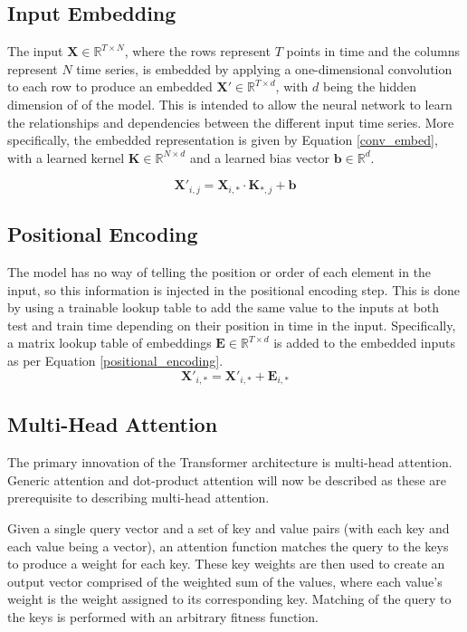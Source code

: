 \documentclass[conference]{IEEEtran}
\begin{document}
\subsection{Input Embedding}
The input $\boldsymbol{X} \in \mathbb{R}^{T \times N}$, where the rows represent $T$ points in time and the columns represent $N$ time series, is embedded by applying a one-dimensional convolution to each row to produce an embedded $\boldsymbol{X}' \in \mathbb{R}^{T \times d}$, with $d$ being the hidden dimension of of the model.
This is intended to allow the neural network to learn the relationships and dependencies between the different input time series.
More specifically, the embedded representation is given by Equation \ref{conv_embed}, with a learned kernel $\boldsymbol{K} \in \mathbb{R}^{N \times d}$ and a learned bias vector $\boldsymbol{b} \in \mathbb{R}^{d}$.

\begin{equation} \label{conv_embed}
\boldsymbol{X}'_{i, j} = \boldsymbol{X}_{i,*} \cdot \boldsymbol{K}_{*, j} + \boldsymbol{b}
\end{equation}

\subsection{Positional Encoding}
The model has no way of telling the position or order of each element in the input, so this information is injected in the positional encoding step.
This is done by using a trainable lookup table to add the same value to the inputs at both test and train time depending on their position in time in the input.
Specifically, a matrix lookup table of embeddings $\boldsymbol{E} \in \mathbb{R}^{T \times d}$ is added to the embedded inputs as per Equation \ref{positional_encoding}.
\begin{equation}\label{positional_encoding}
\boldsymbol{X}'_{i,*} = \boldsymbol{X}'_{i,*} + \boldsymbol{E}_{i,*}
\end{equation}

\subsection{Multi-Head Attention} \label{multihead_attention}
The primary innovation of the Transformer architecture is multi-head attention.
Generic attention and dot-product attention will now be described as these are prerequisite to describing multi-head attention.

Given a single query vector and a set of key and value pairs (with each key and each value being a vector), an attention function matches the query to the keys to produce a weight for each key.
These key weights are then used to create an output vector comprised of the weighted sum of the values, where each value's weight is the weight assigned to its corresponding key. 
Matching of the query to the keys is performed with an arbitrary fitness function.
\end{document}
